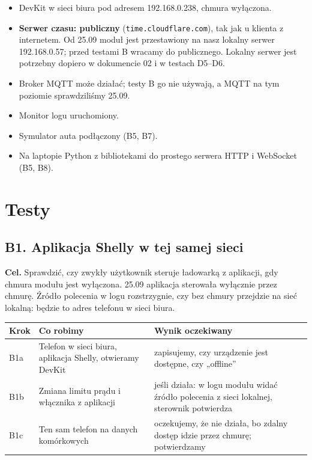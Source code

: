 \documentclass[11pt,a4paper]{article}
\begin{document}
\begin{itemize}
\item DevKit w sieci biura pod adresem 192.168.0.238, chmura wyłączona.
\item \textbf{Serwer czasu: publiczny} (\texttt{time.\allowbreak{}cloudflare.\allowbreak{}com}), tak jak u klienta z internetem. Od 25.09 moduł jest przestawiony na nasz lokalny serwer 192.168.0.57; przed testami B wracamy do publicznego. Lokalny serwer jest potrzebny dopiero w dokumencie 02 i w testach D5–D6.
\item Broker MQTT może działać; testy B go nie używają, a MQTT na tym poziomie sprawdziliśmy 25.09.
\item Monitor logu uruchomiony.
\item Symulator auta podłączony (B5, B7).
\item Na laptopie Python z bibliotekami do prostego serwera HTTP i WebSocket (B5, B8).
\end{itemize}

\section{Testy}

\subsection{B1. Aplikacja Shelly w tej samej sieci}

\textbf{Cel.} Sprawdzić, czy zwykły użytkownik steruje ładowarką z aplikacji, gdy chmura modułu jest wyłączona. 25.09 aplikacja sterowała wyłącznie przez chmurę. Źródło polecenia w logu rozstrzygnie, czy bez chmury przejdzie na sieć lokalną: będzie to adres telefonu w sieci biura.


\begin{longtable}{>{\raggedright\arraybackslash}p{3.00cm}>{\raggedright\arraybackslash}p{4.69cm}>{\raggedright\arraybackslash}p{7.59cm}}
\toprule
\rowcolor{apteallight}\textbf{Krok} & \textbf{Co robimy} & \textbf{Wynik oczekiwany} \\
\midrule\endhead
\bottomrule\endfoot
B1a & Telefon w sieci biura, aplikacja Shelly, otwieramy DevKit & zapisujemy, czy urządzenie jest dostępne, czy „offline” \\
B1b & Zmiana limitu prądu i włącznika z aplikacji & jeśli działa: w logu modułu widać źródło polecenia z sieci lokalnej, sterownik potwierdza \\
B1c & Ten sam telefon na danych komórkowych & oczekujemy, że nie działa, bo zdalny dostęp idzie przez chmurę; potwierdzamy \\
\end{longtable}
\end{document}
